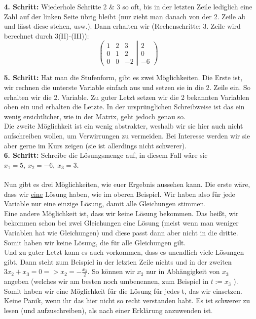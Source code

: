 	\textbf{4. Schritt:} Wiederhole Schritte 2 \& 3 so oft, bis in der letzten
	Zeile lediglich eine Zahl auf der linken Seite übrig bleibt (nur zieht man danach von
	der 2. Zeile ab und lässt diese stehen, usw.). Dann erhalten wir
	(Rechenschritte: 3. Zeile wird berechnet durch 3(II)-(III)):
	\[
	\left(
	 \begin{matrix}
	  1 & 2 & 3\\
	  0 & 1 & 2\\
	  0 & 0 & -2
	 \end{matrix}
	 \left|
	  \begin{matrix}
	   2\\
	   0\\
	   -6
	  \end{matrix}
	 \right)
	\right.
	\]

	\textbf{5. Schritt:} Hat man die Stufenform, gibt es zwei Möglichkeiten. Die
	Erste ist, wir rechnen die unterste Variable einfach aus und setzen sie in die 2.
	Zeile ein. So erhalten wir die 2. Variable. Zu guter Letzt setzen wir die 2
	bekannten Variablen oben ein und erhalten die Letzte. In der ursprünglichen
	Schreibweise ist das ein wenig ersichtlicher, wie in der Matrix, geht jedoch
	genau so.\\
	Die zweite Möglichkeit ist ein wenig abstrakter, weshalb wir sie hier auch
	nicht aufschreiben wollen, um Verwirrungen zu vermeiden. Bei Interesse werden
	wir sie aber gerne im Kurs zeigen (sie ist allerdings nicht schwerer).\\

	\textbf{6. Schritt:} Schreibe die Lösungsmenge auf, in diesem Fall wäre sie
	\(x_1 = 5,\ x_2 =-6,\ x_3 = 3\). \\ \\
	Nun gibt es drei Möglichkeiten, wie euer Ergebnis aussehen kann. Die erste
	wäre, dass wir \underline{eine} Lösung haben, wie im oberen Beispiel. Wir haben
	also für jede Variable nur eine einzige Lösung, damit alle Gleichungen
	stimmen.\\
	Eine andere Möglichkeit ist, dass wir keine Lösung bekommen. Das heißt, wir
	bekommen schon bei zwei Gleichungen eine Lösung (meist wenn man weniger
	Variablen hat wie Gleichungen) und diese passt dann aber nicht in die dritte.
	Somit haben wir keine Lösung, die für alle Gleichungen gilt.\\
	Und zu guter Letzt kann es auch vorkommen, dass es unendlich viele Lösungen
	gibt. Dann steht zum Beispiel in der letzten Zeile nichts und in der zweiten
	\(3x_2 + x_3 = 0 => x_2 = - \frac{x_3}{2}\). So können wir \(x_2\) nur in
	Abhängigkeit von \(x_3\) angeben (welches wir am besten noch umbenennen, zum
	Beispiel in \(t := x_3\) ). Somit haben wir eine Möglichkeit für die Lösung für
	jedes t, das wir einsetzen.\\
	Keine Panik, wenn ihr das hier nicht so recht verstanden habt. Es ist schwerer
	zu lesen (und aufzuschreiben), als nach einer Erklärung anzuwenden ist.
